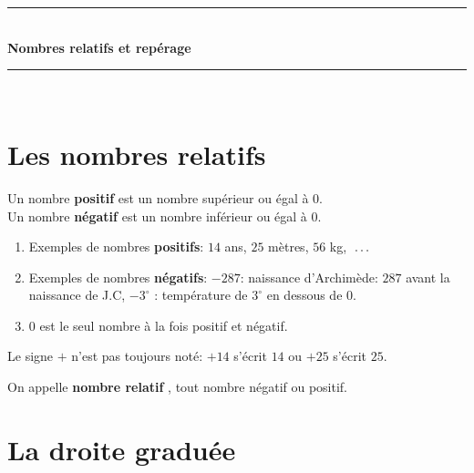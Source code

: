 \documentclass[12pt]{article}
\newif\iftrou\troufalse
\newlength{\trouwidth}
\newcommand{\trou}[1]{%
	\iftrou%
	\settowidth{\trouwidth}{#1}%
	\hbox to \trouwidth{\dotfill}%
	\else%
	#1%
	\fi}
\newcommand\pointille[1][1cm]{\makebox[#1]{\dotfill}}
\begin{document}


\begin{center}
		\rule{\linewidth}{0.5mm} \\[0.4cm]
		{ \huge \bfseries Nombres relatifs et repérage\\[0.4cm] }
		\rule{\linewidth}{0.5mm} \\
\end{center}




\section{Les nombres relatifs}	

\begin{defin}{}{}
	Un nombre \textbf{positif} est un nombre \trou{supérieur ou égal} à 0.\\
	Un nombre \textbf{négatif} est un nombre \trou{inférieur ou égal} à 0.
\end{defin}


\begin{ex}{}{}
	\begin{enumerate}
		\item Exemples de nombres \textbf{positifs}: $14$ ans, $25$ mètres, $56$ kg, $\pointille[0.6cm]$
		\item Exemples de nombres \textbf{négatifs}: $-287$: naissance d'Archimède: $287$ avant la naissance de J.C, $-3^{\circ}$ : température de $3^{\circ}$ en dessous de $0$.
		\item $0$ est le seul nombre à la fois positif et négatif.
	\end{enumerate}
\end{ex}

\begin{rem}{}{}
	Le signe $+$ n'est pas toujours noté: $+14$ s'écrit $14$ ou $+25$ s'écrit $25$.
\end{rem}

\begin{defin}{}{}
	On appelle \trou{\textbf{nombre relatif}}, tout nombre négatif ou positif.
\end{defin}




\section{La droite graduée}
\end{document}

